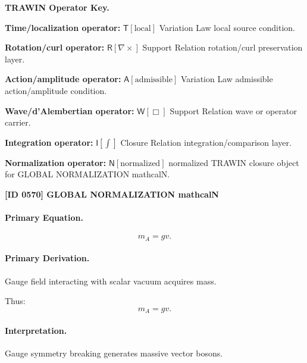 \par\vspace{0.45\baselineskip}
\noindent\begin{minipage}[t]{\linewidth}
\begingroup
\small
\raggedright
\textbf{TRAWIN Operator Key.}\par
\noindent\textbf{Time/localization operator:} $\mathsf{T}\!\left[\mathrm{local}\right]$ Variation Law local source condition.\par
\noindent\textbf{Rotation/curl operator:} $\mathsf{R}\!\left[\nabla\times\right]$ Support Relation rotation/curl preservation layer.\par
\noindent\textbf{Action/amplitude operator:} $\mathsf{A}\!\left[\mathrm{admissible}\right]$ Variation Law admissible action/amplitude condition.\par
\noindent\textbf{Wave/d'Alembertian operator:} $\mathsf{W}\!\left[\Box\right]$ Support Relation wave or operator carrier.\par
\noindent\textbf{Integration operator:} $\mathsf{I}\!\left[\int\right]$ Closure Relation integration/comparison layer.\par
\noindent\textbf{Normalization operator:} $\mathsf{N}\!\left[\mathrm{normalized}\right]$ normalized TRAWIN closure object for GLOBAL NORMALIZATION mathcalN.\par
\endgroup
\end{minipage}

\clearpage
\noindent\textbf{[ID 0570] GLOBAL NORMALIZATION mathcalN}\par
\vspace{0.35em}
\paragraph{Primary Equation.}
\begin{equation}
m_A = gv.
\end{equation}

\paragraph{Primary Derivation.}
Gauge field interacting with scalar vacuum acquires mass.

Thus:
\begin{equation}
\boxed{
m_A = gv.
}
\end{equation}

\paragraph{Interpretation.}
Gauge symmetry breaking generates massive vector bosons.

